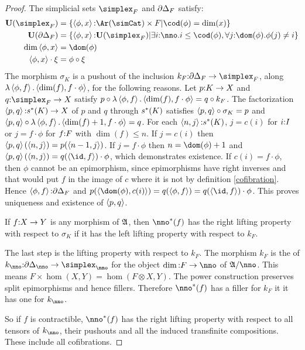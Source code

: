 \documentclass[csh.tex]{subfiles}
\begin{document}
\begin{proof}
The simplicial sets $\simplex_F$ and $\partial\Delta_F$ satisfy:
\begin{align*}
\base(\simplex_F) &= \set{ \tuplet{\phi,x}\of\Ar(\simCat)\times F | \cod(\phi) = \dim(x) } \\
\base(\cycle_F) &= \set{\tuplet{\phi,x}\of\base(\simplex_F)\middle|\exists i\of\nno.i\leq \cod(\phi),\forall j\of \dom(\phi).\phi(j)\neq i} \\
\dim\tuplet{\phi,x} &= \dom(\phi) \\
\tuplet{\phi,x}\cdot \xi &=\phi\circ\xi
\end{align*}
The morphism $\sigma_K$ is a pushout of the inclusion $k_F\of\cycle_F\to\simplex_F$, along $\lambda \left\langle \phi,f \right\rangle .\left\langle \dim(f),f\cdot \phi \right\rangle$, for the following reasons. Let $p\mathord : K \to X$ and $q\of \simplex_F\to X$ satisfy $p\circ \lambda \left\langle \phi,f \right\rangle .\left\langle \dim(f),f\cdot \phi \right\rangle = q\circ k_F$. 
The factorization $\left\langle p,q \right\rangle\mathord : s^*(K)\to X$ of $p$ and $q$ through $s^*(K)$ satisfies $\left\langle p,q \right\rangle\circ \sigma_K = p$ and $\left\langle p,q \right\rangle\circ \lambda \left\langle \phi,f \right\rangle .\left\langle \dim(f)+1,f\cdot \phi \right\rangle = q$. 
For each $\left\langle n,j \right\rangle\mathord : s^*(K)$, $j = c(i)$ for $i\mathord : I$ or $j = f\cdot \phi$ for $f\mathord : F$ with $\dim(f)\leq n$. If $j=c(i)$ then $\left\langle p,q \right\rangle(\left\langle n,j \right\rangle) = p(\left\langle n-1,j \right\rangle)$. If $j = f\cdot \phi$ then $n=\dom(\phi)+1$ and $\tuplet{p,q}(\tuplet{n,j}) = q(\tuplet{\id,f})\cdot\phi$, which demonstrates existence. 
If $c(i)=f\cdot\phi$, then $\phi$ cannot be an epimorphism, since epimorphisms have right inverses and that would put $f$ in the image of $c$ where it is not by definition \ref{cofibration}. Hence $\left\langle \phi,f \right\rangle\mathord :\partial\Delta_F$ and $p(\tuplet{\dom(\phi),c(i)})=q(\tuplet{\phi,f}) = q(\tuplet{\id,f})\cdot\phi$. This proves uniqueness and existence of $\left\langle p,q \right\rangle$.

If $f\mathord : X\to Y$ is any morphism of $\mathfrak A$, then $\nno\ri(f)$ has the right lifting property with respect to $\sigma_K$ if it has the left lifting property with respect to $k_F$.

The last step is the lifting property with respect to $k_F$. The morphism $k_F$ is the  of $k_\nno\of\cycle_\nno\to\simplex_\nno$ for the object $\dim\of F\to\nno$ of $\ambient/\nno$. This means $F\times \hom(X,Y) = \hom(F\otimes X,Y)$.
The power construction preserves split epimorphisms and hence fillers. Therefore $\nno\ri(f)$ has a filler for $k_F$ it it has one for $k_\nno$.

So if $f$ is contractible, $\nno\ri(f)$ has the right lifting property with respect to all tensors of $k_\nno$, their pushouts and all the induced transfinite compositions. These include all cofibrations.
\end{proof}
\end{document}
